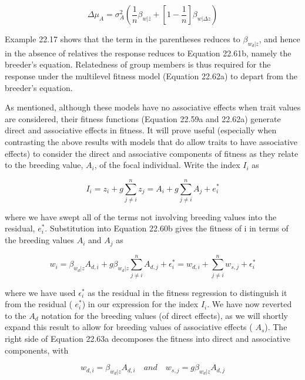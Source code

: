 \documentclass{article}
\begin{document}
\begin{equation}
\Delta\mu_{A}=\sigma_{A}^{2}\left(\frac{1}{n}\beta_{w|\overline{z}}+\left[1-\frac{1}{n}\right]\beta_{w|\Delta z}\right)
\tag{22.62f}
\label{eq:22_62f}
\end{equation}

Example 22.17 shows that the term in the parentheses reduces to  $ \beta_{w_d|z} $, and hence in the absence of relatives the response reduces to Equation 22.61b, namely the breeder's equation. Relatedness of group members is thus required for the response under the multilevel fitness model (Equation 22.62a) to depart from the breeder's equation.

As mentioned, although these models have no associative effects when trait values are considered, their fitness functions (Equation 22.59a and 22.62a) generate direct and associative effects in fitness. It will prove useful (especially when contrasting the above results with models that do allow traits to have associative effects) to consider the direct and associative components of fitness as they relate to the breeding value,  $ A_i $, of the focal individual. Write the index  $ I_i $ as

\begin{equation}
I_{i}=z_{i}+g\sum_{j\neq i}^{n}z_{j}=A_{i}+g\sum_{j\neq i}^{n}A_{j}+e_{i}^{*}
\end{equation}

where we have swept all of the terms not involving breeding values into the residual,  $ e_{i}^{*} $. Substitution into Equation 22.60b gives the fitness of i in terms of the breeding values  $ A_{i} $ and  $ A_{j} $ as

\begin{equation}
w_{i}=\beta_{w_{d}|z}A_{d,i}+g\beta_{w_{d}|z}\sum_{j\neq i}^{n}A_{d,j}+\epsilon_{i}^{*}=w_{d,i}+\sum_{j\neq i}^{n}w_{s,j}+\epsilon_{i}^{*}
\tag{22.63a}
\label{eq:22_63a}
\end{equation}

where we have used  $ \epsilon_i^* $ as the residual in the fitness regression to distinguish it from the residual ( $ e_i^* $) in our expression for the index  $ I_i $. We have now reverted to the  $ A_d $ notation for the breeding values (of direct effects), as we will shortly expand this result to allow for breeding values of associative effects ( $ A_s $). The right side of Equation 22.63a decomposes the fitness into direct and associative components, with

\begin{equation}
w_{d,i}=\beta_{w_{d}|z}A_{d,i}\quad and\quad w_{s,j}=g\beta_{w_{d}|z}A_{d,j}
\tag{22.63b}
\label{eq:22_63b}
\end{equation}
\end{document}
